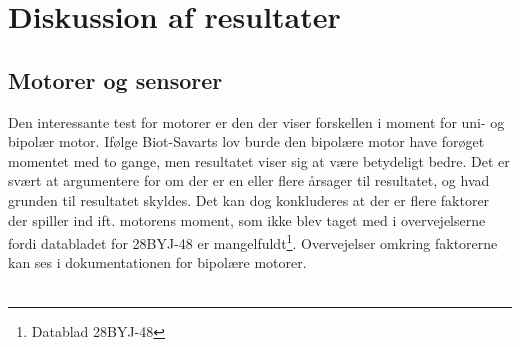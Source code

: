 \chapter{Diskussion af resultater}
\section{Motorer og sensorer}
\label{sec:HW_diskussion}
Den interessante test for motorer er den der viser forskellen i moment for uni- og bipolær motor. Ifølge Biot-Savarts lov burde den bipolære motor have forøget momentet med to gange, men resultatet viser sig at være betydeligt bedre. Det er svært at argumentere for om der er en eller flere årsager til resultatet, og hvad grunden til resultatet skyldes. Det kan dog konkluderes at der er flere faktorer der spiller ind ift. motorens moment, som ikke blev taget med i overvejelserne fordi databladet for 28BYJ-48 er mangelfuldt\footnote{Datablad 28BYJ-48}. Overvejelser omkring faktorerne kan ses i dokumentationen for bipolære motorer.
\\
\\
